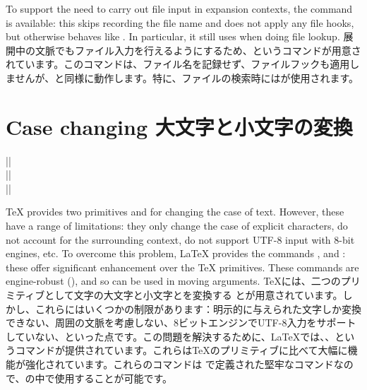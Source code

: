 \documentclass{ltxguide}
\newcommand\jpnewline{\vspace{3pt}\newline}
\begin{document}
To support the need to carry out file input in expansion contexts, the command
 is available: this skips recording the file name and does
not apply any file hooks, but otherwise behaves like . In particular,
it still uses  when doing file lookup.
\jpnewline
展開中の文脈でもファイル入力を行えるようにするため、というコマンドが用意されています。このコマンドは、ファイル名を記録せず、ファイルフックも適用しませんが、と同様に動作します。特に、ファイルの検索時にはが使用されます。

\section{Case changing
大文字と小文字の変換}

\begin{decl}
  |\MakeUppercase|   \\
  |\MakeLowercaes|   \\
  |\MakeTitlecase|  
\end{decl}

\TeX{} provides two primitives  and  for changing
the case of text. However, these have a range of limitations: they only change
the case of explicit characters, do not account for the surrounding context, do
not support UTF-8 input with 8-bit engines, etc. To overcome this problem,
\LaTeX{} provides the commands ,  and
: these offer significant enhancement over the \TeX{}
primitives. These commands are engine-robust (), and so
can be used in moving arguments.
\jpnewline
\TeX{}には、二つのプリミティブとして文字の大文字と小文字とを変換する とが用意されています。しかし、これらにはいくつかの制限があります：明示的に与えられた文字しか変換できない、周囲の文脈を考慮しない、8ビットエンジンでUTF-8入力をサポートしていない、といった点です。この問題を解決するために、\LaTeX{}では、、というコマンドが提供されています。これらは\TeX{}のプリミティブに比べて大幅に機能が強化されています。これらのコマンドは  で定義された堅牢なコマンドなので、の中で使用することが可能です。\label{moving_argument}%
\end{document}
